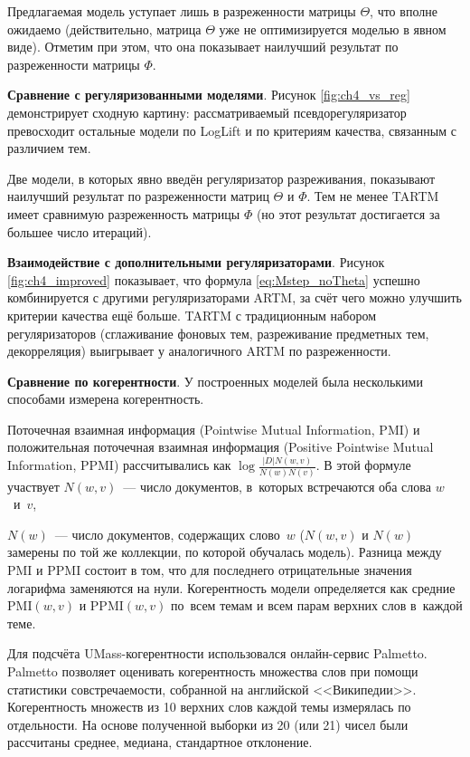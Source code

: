 Предлагаемая модель уступает лишь в разреженности матрицы $\Theta$, что вполне ожидаемо (действительно, матрица $\Theta$ уже не оптимизируется моделью в явном виде). Отметим при этом, что она показывает наилучший результат по разреженности матрицы $\Phi$.

\textbf{Сравнение с регуляризованными моделями}. Рисунок \ref{fig:ch4_vs_reg} демонстрирует сходную картину: рассматриваемый псевдорегуляризатор превосходит остальные модели по LogLift и по критериям качества, связанным с различием тем.

Две модели, в которых явно введён регуляризатор разреживания, показывают наилучший результат по разреженности матриц $\Theta$ и $\Phi$. Тем не менее TARTM имеет сравнимую разреженность матрицы $\Phi$ (но этот результат достигается за большее число итераций).

\textbf{Взаимодействие с дополнительными регуляризаторами}. Рисунок \ref{fig:ch4_improved} показывает, что формула \ref{eq:Mstep_noTheta} успешно комбинируется с другими регуляризаторами ARTM, за счёт чего можно улучшить критерии качества ещё больше. TARTM с традиционным набором регуляризаторов (сглаживание фоновых тем, разреживание предметных тем, декорреляция) выигрывает у аналогичного ARTM по разреженности.




\textbf{Сравнение по когерентности}. У построенных моделей была несколькими способами измерена когерентность.

Поточечная взаимная информация (Pointwise Mutual Information, PMI) и положительная поточечная взаимная информация (Positive Pointwise Mutual Information, PPMI) рассчитывались как $\log\frac{|D| N(w,v)}{N(w)N(v)}$. В этой формуле участвует $N(w,v)$~--- число документов, в~которых встречаются оба слова $w$~и~$v$,

$N(w)$~--- число документов, содержащих слово~$w$ ($N(w,v)$ и $N(w)$ замерены по той же коллекции, по которой обучалась модель). Разница между PMI и PPMI состоит в том, что для последнего отрицательные значения логарифма заменяются на нули. Когерентность модели определяется как средние $\mathrm{PMI}(w,v)$ и $\mathrm{PPMI}(w,v)$ по~всем темам и всем парам верхних слов в~каждой теме.

Для подсчёта UMass-когерентности использовался онлайн-сервис Palmetto. Palmetto позволяет оценивать когерентность множества слов при помощи статистики совстречаемости, собранной на английской <<Википедии>>. Когерентность множеств из 10 верхних слов каждой темы измерялась по отдельности. На основе полученной выборки из 20 (или 21) чисел были рассчитаны среднее, медиана, стандартное отклонение.


